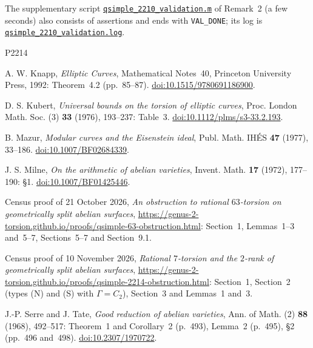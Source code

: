 \documentclass[11pt]{article}
\begin{document}
The supplementary script
\href{https://genus-2-torsion.github.io/data/knowledge/sources/qsimple_2210_validation.m}{\texttt{qsimple\_2210\_validation.m}}
of Remark~2 (a few seconds) also consists of assertions and ends with \texttt{VAL\_DONE}; its log
is
\href{https://genus-2-torsion.github.io/data/knowledge/sources/qsimple_2210_validation.log}{\texttt{qsimple\_2210\_validation.log}}.

\begin{thebibliography}{P2214}

A. W. Knapp, \emph{Elliptic Curves}, Mathematical Notes~40, Princeton University Press, 1992:
Theorem~4.2 (pp.~85--87).
\href{https://doi.org/10.1515/9780691186900}{doi:10.1515/9780691186900}.

D. S. Kubert, \emph{Universal bounds on the torsion of elliptic curves}, Proc. London Math. Soc.
(3) \textbf{33} (1976), 193--237: Table~3.
\href{https://doi.org/10.1112/plms/s3-33.2.193}{doi:10.1112/plms/s3-33.2.193}.

B. Mazur, \emph{Modular curves and the Eisenstein ideal}, Publ. Math. IH\'ES \textbf{47} (1977),
33--186. \href{https://doi.org/10.1007/BF02684339}{doi:10.1007/BF02684339}.

J. S. Milne, \emph{On the arithmetic of abelian varieties}, Invent. Math. \textbf{17} (1972),
177--190: \S1. \href{https://doi.org/10.1007/BF01425446}{doi:10.1007/BF01425446}.

Census proof of 21 October 2026, \emph{An obstruction to rational \(63\)-torsion on geometrically
split abelian surfaces},
\url{https://genus-2-torsion.github.io/proofs/qsimple-63-obstruction.html}: Section~1,
Lemmas~1--3 and~5--7, Sections~5--7 and Section~9.1.

Census proof of 10 November 2026, \emph{Rational \(7\)-torsion and the \(2\)-rank of
geometrically split abelian surfaces},
\url{https://genus-2-torsion.github.io/proofs/qsimple-2214-obstruction.html}: Section~1,
Section~2 (types (N) and (S) with \(\Gamma=C_2\)), Section~3 and Lemmas~1 and~3.

J.-P. Serre and J. Tate, \emph{Good reduction of abelian varieties}, Ann. of Math. (2)
\textbf{88} (1968), 492--517: Theorem~1 and Corollary~2 (p.~493), Lemma~2 (p.~495), \S2
(pp.~496 and~498). \href{https://doi.org/10.2307/1970722}{doi:10.2307/1970722}.

\end{thebibliography}
\end{document}
